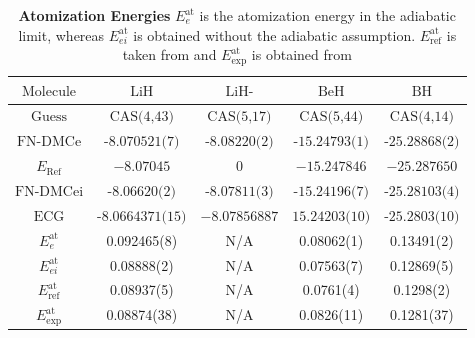 \documentclass[aps,prl,superscriptaddress,groupedaddress]{revtex4}
\begin{document}
\begin{table}[htp]
\setlength{\extrarowheight}{3pt}
\begin{tabular}{*{1}{*{5}{c}}}
\hline\hline
$\text{Molecule}$ & $\text{LiH}$ & $\text{LiH-}$ & $\text{BeH}$ & $\text{BH}$ \\ \hline
$\text{Guess}$ & $\text{CAS(4,43)}$ & $\text{CAS(5,17)}$ & $\text{CAS(5,44)}$ & $\text{CAS(4,14)}$ \\
$\text{FN-DMCe}$ & $\text{-8.070521(7)}$ & $\text{-8.08220(2)}$ & $\text{-15.24793(1)}$ & $\text{-25.28868(2)}$ \\
$E_{\text{Ref}}$ & $-8.07045$ & $0$ & $-15.247846$ & $-25.287650$ \\
$\text{FN-DMCei}$ & $\text{-8.06620(2)}$ & $\text{-8.07811(3)}$ & $\text{-15.24196(7)}$ & $\text{-25.28103(4)}$ \\
$\text{ECG}$ & $\text{-8.0664371(15)}$ & $-8.07856887$ & $\text{15.24203(10)}$ & $\text{-25.2803(10)}$ \\ \hline
$E^{\text{at}}_{e}$ & 0.092465(8)& N/A & 0.08062(1) & 0.13491(2) \\
$E^{\text{at}}_{ei}$ & 0.08888(2)& N/A & 0.07563(7) & 0.12869(5) \\
$E^{\text{at}}_{\text{ref}}$ & 0.08937(5) & N/A & 0.0761(4) & 0.1298(2) \\
$E^{\text{at}}_{\text{exp}}$ & 0.08874(38) & N/A & 0.0826(11) & 0.1281(37) \\
\hline\hline
\end{tabular}
\caption{\textbf{Atomization Energies} $E^{\text{at}}_{e}$ is the atomization energy in the adiabatic limit, whereas $E^{\text{at}}_{ei}$ is obtained without the adiabatic assumption. $E^{\text{at}}_{\text{ref}}$ is taken from \cite{Feller_Corrections} and $E^{\text{at}}_{\text{exp}}$ is obtained from \cite{CCCBDB} \label{tab:atomization}}
\end{table} 


\pagebreak


\end{document}
